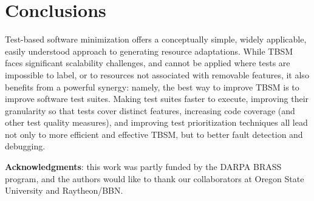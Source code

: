 \section{Conclusions}
Test-based software minimization offers a conceptually simple, widely applicable, easily understood approach to generating resource adaptations. While TBSM faces significant scalability challenges, and cannot be applied where tests are impossible to label, or to resources not associated with removable features, it also benefits from a powerful synergy: namely, the best way to improve TBSM is to improve software test suites. Making test suites faster to execute, improving their granularity so that tests cover distinct features, increasing code coverage (and other test quality measures), and improving test prioritization techniques all lead not only to more efficient and effective TBSM, but to better fault detection and debugging.

{{\bf Acknowledgments}: this work was partly funded by the DARPA
  BRASS~\cite{hughes2016building} program, and the authors would like
  to thank our collaborators at Oregon State University and Raytheon/BBN.}
